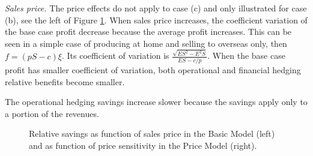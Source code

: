 \documentclass[mnsc,nonblindrev,copyedit]{informs2_wz} %
\newcommand{\OUT}[1]{}
\begin{document}
{\noindent \em Sales price.} The price effects do not apply to case (c) and only illustrated for case (b), see the left of Figure \ref{fig:priceAndSens}.  When sales price increases, the coefficient variation of the base case profit decrease because the average profit increases. This can be seen in a simple case of producing at home and selling to overseas only, then $f = (pS-c)\xi$. Its coefficient of variation is $\frac{\sqrt{ES^2 - E^2S}}{ES - c/p}$. When the base case profit has smaller coefficient of variation, both operational and financial hedging relative benefits become smaller.
 \OUT{Additionally, for financial hedging, this is due to the convexity of utility function's derivative.  Note that financial hedging's role is to bring utilities closer to each other under all exchange rate scenarios.  Let us consider two cash-flow scenarios.  Since cash flow is almost linear in price, the two cash flow can be expressed as $pC_1$ and $pC_2$ with probabilities $q_1$ and $q_2$, respectively.  Then, the financial hedging utility is $U(p(q_1C_1+q_2C_2))$ and the base case utility $q_1U(pC_1) + q_2U(pC_2)$.  When $U^\prime$ is convex (which is the case for exponential utility), the financial hedging utility increases slower than the base-case utility.}
The operational hedging savings increase slower because the savings apply only to a portion of the revenues.

\begin{figure}[ht]
\begin{center}
\begin{minipage}{6in}
    \begin{minipage}{3.1in}
        \epsfxsize=2.8in
    \hspace{-0.0in}    
    \end{minipage}
    \begin{minipage}{2.8in}
        \epsfxsize=2.8in
    \hspace{-0.0in}    
    \end{minipage}
\end{minipage}
\vspace{.05in} \caption{Relative savings as function of sales price in the Basic Model (left) and as function of price sensitivity in the Price Model (right).} \label{fig:priceAndSens}
\vspace{-.2in}
\end{center}
\end{figure}
\end{document}
